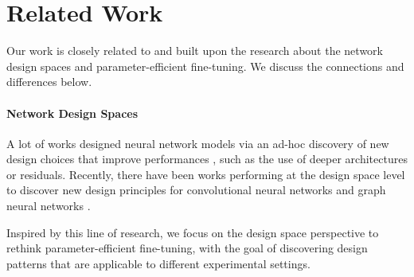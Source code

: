 \section{Related Work} Our work is closely related to and built upon the research about the network design spaces and parameter-efficient fine-tuning. We discuss the connections and differences below.

\paragraph{Network Design Spaces} A lot of works designed neural network models via an ad-hoc discovery of new design choices that improve performances \citep{https://doi.org/10.48550/arxiv.1905.13214}, such as the use of deeper architectures or residuals. Recently, there have been works \citep{https://doi.org/10.48550/arxiv.2003.13678,https://doi.org/10.48550/arxiv.2011.08843,https://doi.org/10.48550/arxiv.1905.13214} performing at the design space level to discover new design principles for convolutional neural networks \citep{https://doi.org/10.48550/arxiv.2003.13678} and graph neural networks \citep{https://doi.org/10.48550/arxiv.2011.08843}. 

Inspired by this line of research, we focus on the design space perspective to rethink parameter-efficient fine-tuning, with the goal of discovering design patterns that are applicable to different experimental settings.

